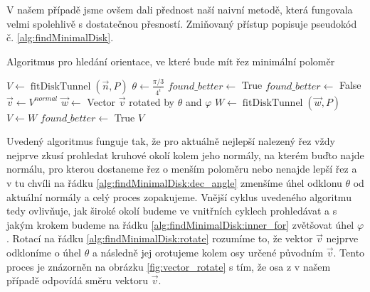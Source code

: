 V našem případě jsme ovšem dali přednost naší naivní metodě, která
fungovala velmi spolehlivě s dostatečnou přesností. Zmiňovaný přístup popisuje
pseudokód č. \ref{alg:findMinimalDisk}.


\begin{algorithm}
\caption{Algoritmus pro hledání orientace, ve které bude mít řez minimální poloměr}
\label{alg:findMinimalDisk}
\begin{algorithmic}[1]


    \State $ V  \gets \operatorname{fitDiskTunnel}(\vec{n}, P) $
        \State $ \theta \gets \frac{\pi / 3}{4^i} $ \label{alg:findMinimalDisk:dec_angle}
        \State $ found\_better \gets $ True
            \State $ found\_better \gets $ False
            \State $ \vec{v} \gets V^{normal} $
             \label{alg:findMinimalDisk:inner_for}
                \State $ \vec{w} \gets$ Vector $\vec{v} $ rotated by $ \theta $ and $\varphi $ \label{alg:findMinimalDisk:rotate}
                \State $ W \gets \operatorname{fitDiskTunnel}(\vec{w}, P) $
                  \label{alg:findMinimalDisk:if}
                    \State $ V \gets W $
                    \State $ found\_better \gets $ True
                \EndIf
            \EndFor
        \EndWhile
    \EndFor
    \State \Return $V$
\EndFunction

\end{algorithmic}
\end{algorithm}

Uvedený algoritmus funguje tak, že pro aktuálně nejlepší nalezený řez vždy nejprve
zkusí prohledat kruhové okolí kolem jeho normály, na kterém buďto najde normálu,
pro kterou dostaneme řez o menším poloměru nebo nenajde lepší řez a v tu chvíli
na řádku \ref{alg:findMinimalDisk:dec_angle} zmenšíme úhel odklonu $ \theta $
od aktuální normály a celý proces zopakujeme.
Vnější cyklus uvedeného algoritmu tedy ovlivňuje, jak široké okolí budeme ve vnitřních
cyklech prohledávat a s jakým krokem budeme na řádku \ref{alg:findMinimalDisk:inner_for}
zvětšovat úhel $\varphi $. Rotací na řádku \ref{alg:findMinimalDisk:rotate} rozumíme to,
že vektor $\vec{v} $ nejprve odkloníme o úhel $ \theta $ a následně jej orotujeme
kolem osy určené původním $\vec{v} $. Tento proces je znázorněn na obrázku
\ref{fig:vector_rotate} s tím, že osa z v našem případě odpovídá směru vektoru
$\vec{v} $.

